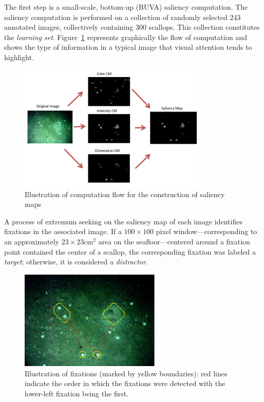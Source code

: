 \documentclass {udthesis}
\begin{document}
The first step is a small-scale, bottom-up (BUVA) saliency computation. 
The saliency computation is performed 
on a collection of randomly selected 243 annotated images, collectively containing 300 scallops.
This collection constitutes the \emph{learning set}.
Figure~\ref{fig:saliency_combine} represents graphically the flow of computation
and shows the type of information in a typical image that visual attention tends to highlight.
%
\begin{figure}
\vskip -5pt
\centering
\includegraphics[width=0.80\textwidth,natwidth=864,natheight=582]{saliency_example1.png}
\caption{Illustration of computation flow for the construction of saliency maps}
\label{fig:saliency_combine}
\end{figure}
%

A process of extremum
seeking on the saliency map of each image identifies fixations in the associated image.
If a $100\times100$ pixel window---corresponding to an approximately $23 \times 23$\enspace cm$^2$ area on the seafloor---centered around a fixation point
contained the center of a scallop, the corresponding 
fixation was labeled a \emph{target}; otherwise, it is considered a \emph{distractor}.

\begin{figure} 
\centering
\includegraphics[width=0.6\textwidth,natwidth=800,natheight=600]{fixation_example.pdf}
\caption{Illustration of fixations (marked by yellow boundaries):
         red lines indicate the order in which the fixations were detected with the lower-left fixation being the first.
}
\label{fig:fixation}
\end{figure}
\end{document}
